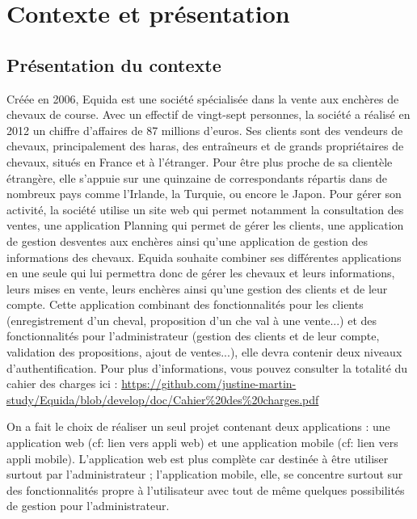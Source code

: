 \chapter{Contexte et présentation}
	\section{Présentation du contexte}
		Créée en 2006, Equida est une société spécialisée dans la vente aux enchères de chevaux de course. Avec un effectif de vingt-sept personnes, la société a réalisé en 2012 un chiffre d’affaires de 87 millions d’euros. Ses clients sont des vendeurs de chevaux, principalement des haras, des entraîneurs et de grands propriétaires de chevaux, situés en France et à l’étranger. Pour être plus proche de sa clientèle étrangère, elle s’appuie sur une quinzaine de correspondants répartis dans de nombreux pays comme l’Irlande, la Turquie, ou encore le Japon.\newline
		Pour gérer son activité, la société utilise un site web qui permet notamment la consultation des ventes, une application Planning qui permet de gérer les clients, une application de gestion desventes aux enchères ainsi qu'une application de gestion des informations des chevaux.\newline
		Equida souhaite combiner ses différentes applications en une seule qui lui permettra donc de gérer les chevaux et leurs informations, leurs mises en vente, leurs enchères ainsi qu'une gestion des clients et de leur compte. Cette application combinant des fonctionnalités pour les clients (enregistrement d'un cheval, proposition d'un che val à une vente...) et des fonctionnalités pour l'administrateur (gestion des clients et de leur compte, validation des propositions, ajout de ventes...), elle devra contenir deux niveaux d'authentification.
		Pour plus d'informations, vous pouvez consulter la totalité du cahier des charges ici : \url{https://github.com/justine-martin-study/Equida/blob/develop/doc/Cahier%20des%20charges.pdf}

		On a fait le choix de réaliser un seul projet contenant deux applications : une application web (cf: lien vers appli web) et une application mobile (cf: lien vers appli mobile). L'application web est plus complète car destinée à être utiliser surtout par l'administrateur ; l'application mobile, elle, se concentre surtout sur des fonctionnalités propre à l'utilisateur avec tout de même quelques possibilités de gestion pour l'administrateur.

